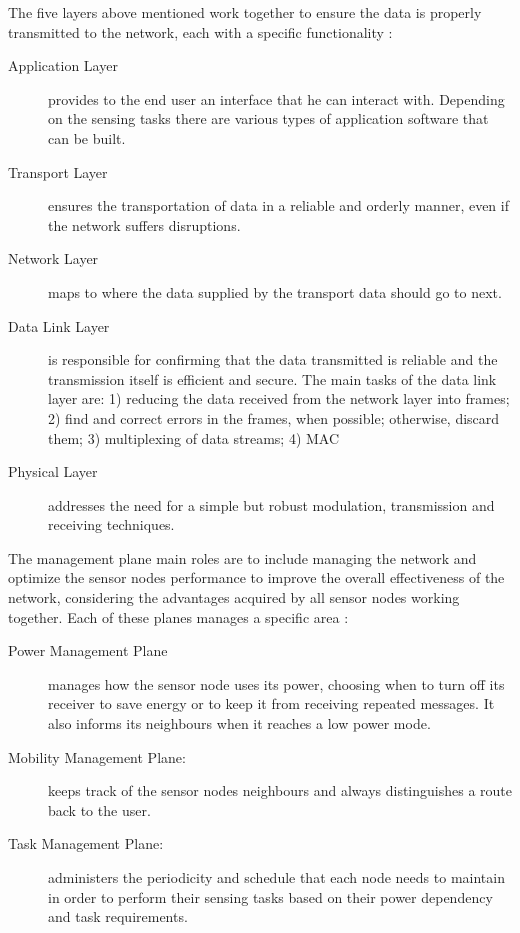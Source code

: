 The five layers above mentioned work together to ensure the data is properly transmitted to
the network, each with a specific functionality \cite{Akyildiz2002, Matin2012}:
\begin{description}
      \item[Application Layer] provides to the end user an interface that he can interact with.
            Depending on the sensing tasks there are various types of application software that can
            be built.
      \item[Transport Layer] ensures the transportation of data in a reliable and orderly manner,
            even if the network suffers disruptions.
      \item[Network Layer] maps to where the data supplied by the transport data should go to
            next.
      \item[Data Link Layer] is responsible for confirming that the data transmitted is
            reliable and the transmission itself is efficient and secure. The main tasks of the
            data link layer are: 1) reducing the data received from the network layer into frames;
            2) find and correct errors in the frames, when possible; otherwise, discard them; 3)
            multiplexing of data streams; 4) \Gls{MAC}
      \item[Physical Layer] addresses the need for a simple but robust modulation, transmission
            and receiving techniques.
\end{description}

The management plane main roles are to include managing the network and optimize the sensor
nodes performance to improve the overall effectiveness of the network, considering the
advantages acquired by all sensor nodes working together. Each of these planes manages
a specific area \cite{Akyildiz2002}:
\begin{description}
      \item[Power Management Plane] manages how the sensor node uses its power, choosing when to
            turn off its receiver to save energy or to keep it from receiving repeated messages. It
            also informs its neighbours when it reaches a low power mode.
      \item[Mobility Management Plane:] keeps track of the sensor nodes neighbours and always
            distinguishes a route back to the user.
      \item[Task Management Plane:] administers the periodicity and schedule that each node needs
            to maintain in order to perform their sensing tasks based on their power dependency and
            task requirements.
\end{description}

